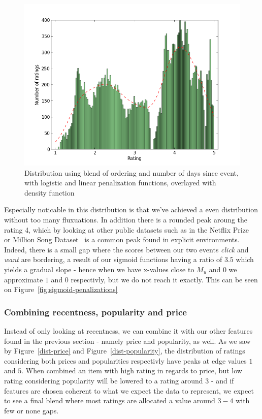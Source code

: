 \begin{figure}[H]
  \centering
  \label{dist-blend}
  \includegraphics[scale=0.5]{image/dist-blend}
  \caption{Distribution using blend of ordering and number of days since event,
  with logistic and linear penalization functions, overlayed with density
  function}
\end{figure}

Especially noticable in this distribution is that we've achieved a even
distribution without too many fluxuations. In addition there is a rounded peak
aroung the rating 4, which by looking at other public datasets such as in the
Netflix Prize~\cite{Netflix} or Million Song Dataset~\cite{Bertin-Mahieux-2011}
is a common peak found in explicit environments. Indeed, there is a small gap
where the scores between our two events \textit{click} and \textit{want} are
bordering, a result of our sigmoid functions having a ratio of $3.5$ which
yields a gradual slope - hence when we have x-values close to $M_u$ and $0$ we
approximate $1$ and $0$ respectivly, but we do not reach it exactly. This can
be seen on Figure~\ref{fig:sigmoid-penalizations}

\subsubsection{Combining recentness, popularity and price}

Instead of only looking at recentness, we can combine it with our other
features found in the previous section - namely price and popularity, as well.
As we saw by Figure~\ref{dist-price} and Figure~\ref{dist-popularity}, the
distribution of ratings considering both prices and popularities respectivly
have peaks at edge values $1$ and $5$. When combined an item with high rating
in regards to price, but low rating considering popularity will be lowered to a
rating around $3$ - and if features are chosen coherent to what we expect the
data to represent, we expect to see a final blend where most ratings are
allocated a value around $3-4$ with few or none gaps.

